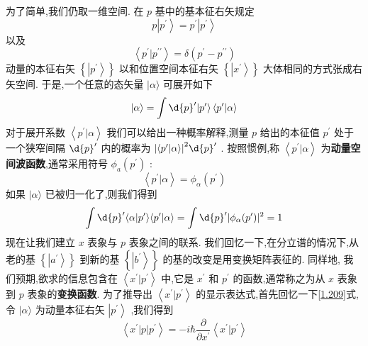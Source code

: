为了简单,我们仍取一维空间. 在 $p$ 基中的基本征右矢规定
\begin{equation}
	p\left| {p}^{\prime }\right\rangle = {p}^{\prime }\left| {p}^{\prime }\right\rangle
\end{equation}
以及
\begin{equation}
	\left\langle {{p}^{\prime } | {p}^{\prime \prime }}\right\rangle = \delta \left( {{p}^{\prime } - {p}^{\prime \prime }}\right)
\end{equation}
动量的本征右矢 $\left\{ \left| {p}^{\prime }\right\rangle \right\}$ 以和位置空间本征右矢 $\left\{ \left| {x}^{\prime }\right\rangle \right\}$ 大体相同的方式张成右矢空间. 于是,一个任意的态矢量 $|\alpha \rangle$ 可展开如下
\begin{equation}
	| {\alpha \rangle = \int \d{p}^{\prime }}| {p}^{\prime }\rangle \left\langle {{p}^{\prime } | \alpha }\right\rangle
\end{equation}
对于展开系数 $\left\langle {{p}^{\prime } | \alpha }\right\rangle$ 我们可以给出一种概率解释,测量 $p$ 给出的本征值 ${p}^{\prime }$ 处于一个狭窄间隔 $\d{p}^{\prime }$ 内的概率为 ${\left| \left\langle {p}^{\prime } | \alpha \right\rangle \right| }^{2}\d{p}^{\prime }$ . 按照惯例,称 $\left\langle {{p}^{\prime } | \alpha }\right\rangle$ 为\textbf{动量空间波函数},通常采用符号 ${\phi }_{a}\left( {p}^{\prime }\right)$ :
\begin{equation}
	\left\langle {{p}^{\prime } | \alpha }\right\rangle = {\phi }_{\alpha }\left( {p}^{\prime }\right) 
\end{equation}
如果 $|\alpha \rangle$ 已被归一化了,则我们得到
\begin{equation}
	\int \d{p}^{\prime }\langle {\alpha | {{p}^{\prime }\rangle \langle {{p}^{\prime } | \alpha }\rangle = \int \d{p}^{\prime }}| {\phi }_{\alpha }( {p}^{\prime }) {| }^{2} = 1}
\end{equation}
现在让我们建立 $x$ 表象与 $p$ 表象之间的联系. 我们回忆一下,在分立谱的情况下,从老的基 $\left\{ \left| {a}^{\prime }\right\rangle \right\}$ 到新的基 $\left\{ \left| {b}^{\prime }\right\rangle \right\}$ 的基的改变是用变换矩阵表征的. 同样地, 我们预期,欲求的信息包含在 $\left\langle {{x}^{\prime } | {p}^{\prime }}\right\rangle$ 中,它是 ${x}^{\prime }$ 和 ${p}^{\prime }$ 的函数,通常称之为从 $x$ 表象到 $p$ 表象的\textbf{变换函数}. 为了推导出 $\left\langle {{x}^{\prime } | {p}^{\prime }}\right\rangle$ 的显示表达式,首先回忆一下\ref{1.209}式, 令 $|\alpha \rangle$ 为动量本征右矢 $\left| {p}^{\prime }\right\rangle$ ,我们得到
\begin{equation}
	\left\langle {{x}^{\prime }\left| p\right| {p}^{\prime }}\right\rangle = - i\hbar \frac{\partial }{\partial {x}^{\prime }}\left\langle {{x}^{\prime } | {p}^{\prime }}\right\rangle
\end{equation}

